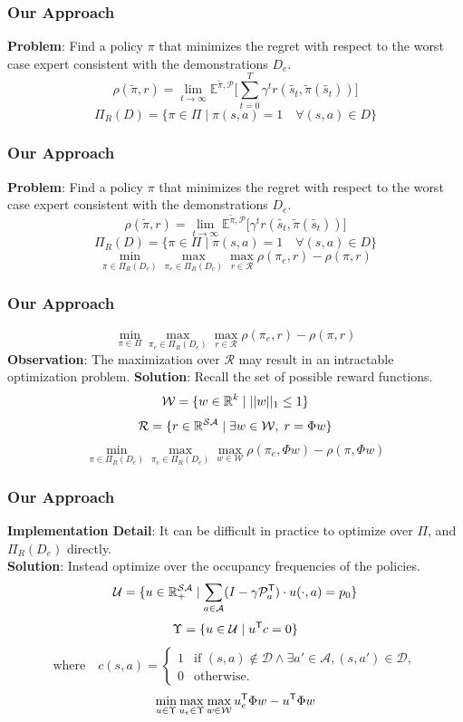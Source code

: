 \documentclass{beamer}
\begin{document}
\begin{frame}
	\frametitle{Our Approach}
	\textbf{Problem}: Find a policy $\pi$ that minimizes the regret with respect to the worst case expert consistent with the demonstrations $D_e$.
	\[ \rho(\tilde{\pi}, r) = \lim_{t \to \infty} \mathbb{E}^{\tilde{\pi}, \mathcal{P}} \lbrack \sum_{t=0}^T \gamma^t r(\tilde{s_t}, \tilde{\pi}(\tilde{s_t})) \rbrack \]
	\[ \Pi_R(D) = \lbrace \pi \in \Pi \mid \pi(s,a) = 1 \quad \forall (s,a) \in D \rbrace \]
\end{frame}


\begin{frame}
	\frametitle{Our Approach}
	\textbf{Problem}: Find a policy $\pi$ that minimizes the regret with respect to the worst case expert consistent with the demonstrations $D_e$.
	\[ \rho(\tilde{\pi}, r) = \lim_{t \to \infty} \mathbb{E}^{\tilde{\pi}, \mathcal{P}} \lbrack \gamma^t r(\tilde{s_t}, \tilde{\pi}(\tilde{s_t})) \rbrack \]
	\[ \Pi_R(D) = \lbrace \pi \in \Pi \mid \pi(s,a) = 1 \quad \forall (s,a) \in D \rbrace \]
	\[ \min_{\pi \in \Pi_R(D_e)} \max_{\pi_e \in \Pi_R(D_e)} \max_{r \in \mathcal{R}} \rho(\pi_e, r) - \rho(\pi, r)\]
\end{frame}

\begin{frame}
	\frametitle{Our Approach}
	\[ \min_{\pi \in \Pi} \max_{\pi_e \in \Pi_R(D_e)} \max_{r \in \mathcal{R}} \rho(\pi_e, r) - \rho(\pi, r)\]
	\textbf{Observation}: The maximization over $\mathcal{R}$ may result in an intractable optimization problem.
	\textbf{Solution}: Recall the set of possible reward functions.
        \[ \mathcal{W} = \lbrace w \in \mathbb{R}^k \mid \lvert \lvert w \rvert \rvert_1 \leq 1 \rbrace \]
	\[ \mathcal{R} = \lbrace r \in \mathbb{R}^{\mathcal{S} \mathcal{A}} \mid \exists w \in \mathcal{W}, \; r = \Phi w \rbrace \]
	\[ \min_{\pi \in \Pi_R(D_e)} \max_{\pi_e \in \Pi_R(D_e)} \max_{w \in \mathcal{W}} \rho(\pi_e, \Phi w) - \rho(\pi, \Phi w)\]
\end{frame}

\begin{frame}
	\frametitle{Our Approach}
	\textbf{Implementation Detail}: It can be difficult in practice to optimize over $\Pi$, and $\Pi_R(D_e)$ directly.\\
	\textbf{Solution}: Instead optimize over the occupancy frequencies of the policies.
	\[ \mathcal{U} = \lbrace u \in \mathbb{R}_{+}^{\mathcal{SA}} \mid \sum_{a \in \mathcal{A}} (I - \gamma \mathcal{P}_a^{\mathsf{T}}) \cdot u(\cdot, a) = p_0 \rbrace \]
	\[ \Upsilon = \lbrace u \in \mathcal{U} \mid u^{\mathsf{T}} c = 0 \rbrace \]
	\[ \text{where} \quad c(s,a) =
	\begin{cases}
	1 &\text{if  }
		(s,a) \notin \mathcal{D} \wedge
		\exists a'\in \mathcal{A}, (s, a') \in \mathcal{D}, \\
	0 & \text{otherwise}.
	\end{cases} \]
	\[ \min_{u \in \Upsilon} \max_{u_e \in \Upsilon} \max_{w \in \mathcal{W}} u_e^{\mathsf{T}} \Phi w - u^{\mathsf{T}} \Phi w\]
\end{frame}
\end{document}
